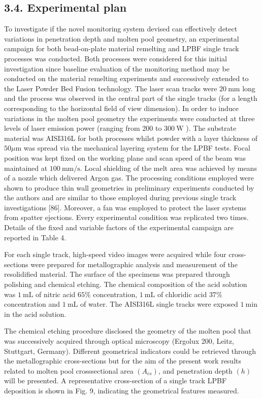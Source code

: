 \documentclass[10pt]{article}
\begin{document}
\subsection*{3.4. Experimental plan}
To investigate if the novel monitoring system devised can effectively detect variations in penetration depth and molten pool geometry, an experimental campaign for both bead-on-plate material remelting and LPBF single track processes was conducted. Both processes were considered for this initial investigation since baseline evaluation of the monitoring method may be conducted on the material remelting experiments and successively extended to the Laser Powder Bed Fusion technology. The laser scan tracks were $20 \mathrm{~mm}$ long and the process was observed in the central part of the single tracks (for a length corresponding to the horizontal field of view dimension). In order to induce variations in the molten pool geometry the experiments were conducted at three levels of laser emission power (ranging from 200 to $300 \mathrm{~W}$ ). The substrate material was AISI316L for both processes whilst powder with a layer thickness of $50 \mu \mathrm{m}$ was spread via the mechanical layering system for the LPBF tests. Focal position was kept fixed on the working plane and scan speed of the beam was maintained at $100 \mathrm{~mm} / \mathrm{s}$. Local shielding of the melt area was achieved by means of a nozzle which delivered Argon gas. The processing conditions employed were shown to produce thin wall geometries in preliminary experiments conducted by the authors and are similar to those employed during previous single track investigations [86]. Moreover, a fan was employed to protect the laser systems from spatter ejections. Every experimental condition was replicated two times. Details of the fixed and variable factors of the experimental campaign are reported in Table 4.

For each single track, high-speed video images were acquired while four cross-sections were prepared for metallographic analysis and measurement of the resolidified material. The surface of the specimens was prepared through polishing and chemical etching. The chemical composition of the acid solution was $1 \mathrm{~mL}$ of nitric acid $65 \%$ concentration, $1 \mathrm{~mL}$ of chloridic acid $37 \%$ concentration and $1 \mathrm{~mL}$ of water. The AISI316L single tracks were exposed $1 \mathrm{~min}$ in the acid solution.

The chemical etching procedure disclosed the geometry of the molten pool that was successively acquired through optical microscopy (Ergolux 200, Leitz, Stuttgart, Germany). Different geometrical indicators could be retrieved through the metallographic cross-sections but for the aim of the present work results related to molten pool crosssectional area $\left(A_{c s}\right)$, and penetration depth $(h)$ will be presented. A representative cross-section of a single track LPBF deposition is shown in Fig. 9, indicating the geometrical features measured.
\end{document}
